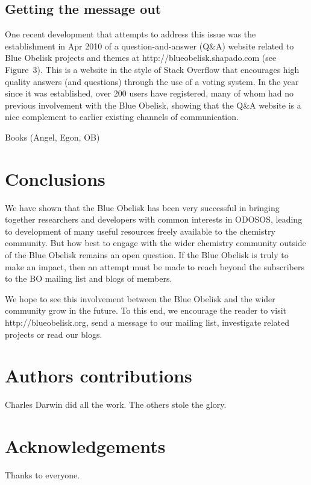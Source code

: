 \documentclass[10pt]{bmc_article}
\newenvironment{bmcformat}{\begin{raggedright}\baselineskip20pt\sloppy\setboolean{publ}{false}}{\end{raggedright}\baselineskip20pt\sloppy}
\begin{document}
\begin{bmcformat}
\subsection*{Getting the message out}

One recent development
that attempts to address this issue was the establishment in Apr 2010 of a
question-and-answer (Q\&A)
website related to Blue Obelisk projects and themes at
http://blueobelisk.shapado.com (see Figure~3). This is a website in the
style of Stack Overflow that encourages high quality answers (and
questions) through the use of a voting system. In the year since it
was established, over
200 users have registered, many of whom had no previous involvement
with the Blue Obelisk, showing that the Q\&A website is a nice complement
to earlier existing channels of communication.


Books (Angel, Egon, OB)

\section*{Conclusions}

We have shown that the Blue Obelisk has been very successful
in bringing together researchers and developers with common interests
in ODOSOS, leading to development of many useful resources freely
available to the chemistry community. But how best to engage with the
wider chemistry community outside of the Blue Obelisk remains an open
question. If the Blue Obelisk is truly to make an impact,
then an attempt must be made to reach beyond the subscribers to the
BO mailing list and blogs of members.

We hope to see this involvement between the Blue Obelisk and the wider
community grow in the future. To this end, we encourage the reader to
visit http://blueobelisk.org, send a message to our mailing list,
investigate related projects or read our blogs.


\section*{Authors contributions}
   Charles Darwin did all the work. The others stole the glory. 
    

\section*{Acknowledgements}
  Thanks to everyone.



\end{bmcformat}
\end{document}
